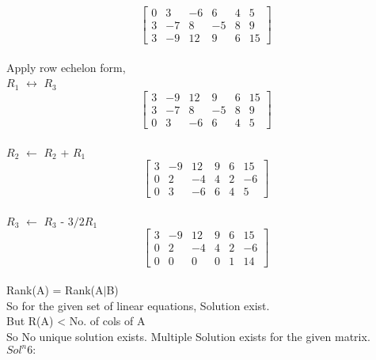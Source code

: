 \documentclass{article}
\begin{document}
 $$
  \left[\begin{array}{rrrrr|r}
    0 & 3 & -6 & 6 & 4 & 5 \\
    3 & -7 & 8 & -5 & 8 & 9 \\
    3 & -9 & 12 & 9 & 6 & 15
  \end{array}\right]
$$ \\

Apply row echelon form, \\

$R_1$ $\leftrightarrow$ $R_3$ \\

 $$
  \left[\begin{array}{rrrrr|r}
    3 & -9 & 12 & 9 & 6 & 15 \\
    3 & -7 & 8 & -5 & 8 & 9 \\
    0 & 3 & -6 & 6 & 4 & 5
  \end{array}\right]
$$ \\

$R_2$ $\leftarrow$ $R_2$ + $R_1$ \\

$$
  \left[\begin{array}{rrrrr|r}
    3 & -9 & 12 & 9 & 6 & 15 \\
    0 & 2 & -4 & 4 & 2 & -6 \\
    0 & 3 & -6 & 6 & 4 & 5
  \end{array}\right]
$$ \\

$R_3$ $\leftarrow$ $R_3$ - $3/2R_1$ \\

$$
  \left[\begin{array}{rrrrr|r}
    3 & -9 & 12 & 9 & 6 & 15 \\
    0 & 2 & -4 & 4 & 2 & -6 \\
    0 & 0 & 0 & 0 & 1 & 14
  \end{array}\right]
$$ \\

Rank(A) = Rank(A$\mid$B)\\

So for the given set of linear equations, Solution exist.\\

But R(A) < No. of cols of A \\

So No unique solution exists. Multiple Solution exists for the given matrix.\\

$Sol^n 6:$ \\
\end{document}
